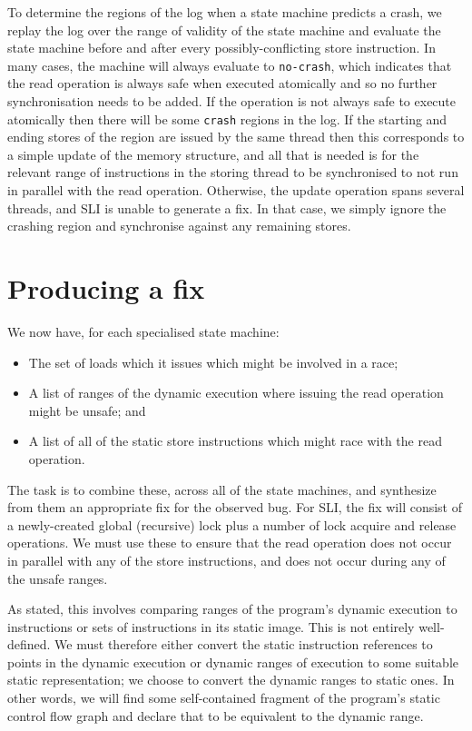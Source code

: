\documentclass[10pt,letter,twocolumn]{sigplanconf}
\begin{document}
To determine the regions of the log when a state machine predicts a
crash, we replay the log over the range of validity of the state
machine and evaluate the state machine before and after every
possibly-conflicting store instruction.  In many cases, the machine
will always evaluate to \verb|no-crash|, which indicates that the read
operation is always safe when executed atomically and so no further
synchronisation needs to be added.  If the operation is not always
safe to execute atomically then there will be some \verb|crash|
regions in the log.  If the starting and ending stores of the region
are issued by the same thread then this corresponds to a simple update
of the memory structure, and all that is needed is for the relevant
range of instructions in the storing thread to be synchronised to not
run in parallel with the read operation.  Otherwise, the update
operation spans several threads, and SLI is unable to generate a fix.
In that case, we simply ignore the crashing region and synchronise
against any remaining stores.

\section{Producing a fix}
We now have, for each specialised state machine:

\begin{itemize}
\item The set of loads which it issues which might be involved in a
  race;
\item A list of ranges of the dynamic execution where issuing the read
  operation might be unsafe; and
\item A list of all of the static store instructions which might race
  with the read operation.
\end{itemize}

The task is to combine these, across all of the state machines, and
synthesize from them an appropriate fix for the observed bug.  For
SLI, the fix will consist of a newly-created global (recursive) lock
plus a number of lock acquire and release operations.  We must use
these to ensure that the read operation does not occur in parallel
with any of the store instructions, and does not occur during any of
the unsafe ranges.

As stated, this involves comparing ranges of the program's dynamic
execution to instructions or sets of instructions in its static image.
This is not entirely well-defined.  We must therefore either convert
the static instruction references to points in the dynamic execution
or dynamic ranges of execution to some suitable static representation;
we choose to convert the dynamic ranges to static ones.  In other
words, we will find some self-contained fragment of the program's
static control flow graph and declare that to be equivalent to the
dynamic range.
\end{document}
